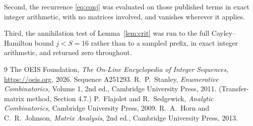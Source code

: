 \documentclass[11pt,a4paper]{article}
\theoremstyle{plain}
\theoremstyle{definition}
\begin{document}
Second, the recurrence \eqref{eq:conj} was evaluated on those published terms in exact
integer arithmetic, with no matrices involved, and vanishes wherever it applies.

Third, the annihilation test of Lemma~\ref{lem:crit} was run to the full Cayley--Hamilton
bound $j<S=16$ rather than to a sampled prefix, in exact integer arithmetic, and returned
zero throughout.

\begin{thebibliography}{9}
 The OEIS Foundation, \emph{The On-Line Encyclopedia of Integer
Sequences}, \url{https://oeis.org}, 2026. Sequence A251293.
 R.~P.~Stanley, \emph{Enumerative Combinatorics}, Volume 1, 2nd ed.,
Cambridge University Press, 2011. (Transfer-matrix method, Section 4.7.)
 P.~Flajolet and R.~Sedgewick, \emph{Analytic Combinatorics}, Cambridge
University Press, 2009.
 R.~A.~Horn and C.~R.~Johnson, \emph{Matrix Analysis}, 2nd ed., Cambridge
University Press, 2013.
\end{thebibliography}
\end{document}
